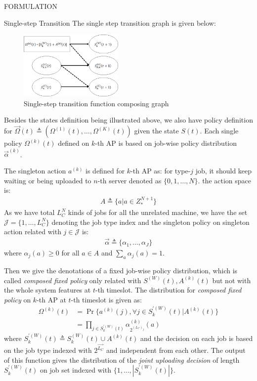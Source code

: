 \documentclass[10pt, conference, letterpaper]{IEEEtran}
\begin{document}
\begin{section}{FORMULATION}
\begin{subsection}{Single-step Transition}
            The single step transition graph is given below:
            \begin{figure}[ht]
                \centering
                \includegraphics[width=0.45\textwidth]{single-transition.png}
                \caption{Single-step transition function composing graph}
                \label{fig:trans}
            \end{figure}
            Besides the states definition being illustrated above, we also have policy definition for $\vec{\Omega}(t) \triangleq (\Omega^{(1)}(t), \dots, \Omega^{(K)}(t))$ given the state $S(t)$. Each single policy $\Omega^{(k)}(t)$ defined on $k$-th AP is based on job-wise policy distribution $\vec{\alpha}^{(k)}$.

            The singleton action $a^{(k)}$ is defined for $k$-th AP as: for type-$j$ job, it should keep waiting or being uploaded to $n$-th server denoted as $\{0,1,\dots,N\}$. the action space is:
            \begin{align}
                A \triangleq \{a|a \in Z_*^{N+1}\}
            \end{align}
            As we have total $L_C^{N}$ kinds of jobs for all the unrelated machine, we have the set $\mathcal{J}=\{1, \dots, L_C^{N}\}$ denoting the job type index and the singleton policy on singleton action related with $j \in \mathcal{J}$ is:
            \begin{align}
                \vec{\alpha} \triangleq \{\alpha_1,\dots,\alpha_J\}
            \end{align}
            where $\alpha_j(a) \geq 0$ for all $a \in A$ and $\sum_a \alpha_j(a) = 1$.

            Then we give the denotations of a fixed job-wise policy distribution, which is called \emph{composed fixed policy} only related with $S^{(W)}(t), A^{(k)}(t)$ but not with the whole system features at $t$-th timeslot. The distribution for \emph{composed fixed policy} on $k$-th AP at $t$-th timeslot is given as:
            \begin{align}
                \Omega^{(k)}(t) &= \Pr\{a^{(k)}(j), \forall j \in S^{'(W)}_k(t) | A^{(k)}(t)\}
                \nonumber\\
                &= \prod_{j \in S^{'(W)}_k(t)} \alpha_{2^{(L_C)_j}}^{(k)}(a)
            \end{align}
            where $S^{'(W)}_k(t) \triangleq S^{(W)}_k(t) \cup A^{(k)}(t)$ and the decision on each job is based on the job type indexed with $2^{\vec{L_C}}$ and independent from each other. The output of this function gives the distribution of the \emph{joint uploading decision} of length $S^{'(W)}_k(t)$ on job set indexed with $\{1,\dots,|S^{'(W)}_k(t)|\}$.


\end{subsection}
\end{section}
\end{document}
